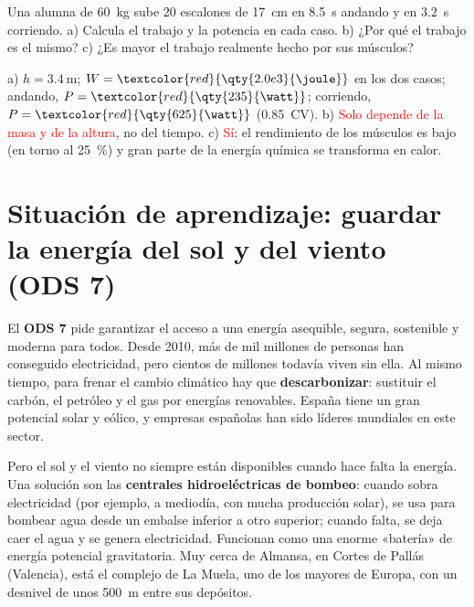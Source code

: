 \begin{exercise}
    Una alumna de \qty{60}{\kg} sube 20 escalones de \qty{17}{\cm} en \qty{8.5}{\s} andando y en \qty{3.2}{\s} corriendo. a) Calcula el
    trabajo y la potencia en cada caso. b) ¿Por qué el trabajo es el mismo? c) ¿Es mayor el trabajo realmente hecho por sus músculos?
    \begin{solu}
        a) \(h = \qty{3.4}{\m}\); \(W = \textcolor{red}{\qty{2.0e3}{\joule}}\) en los dos casos; andando, \(P = \textcolor{red}{\qty{235}{\watt}}\);
        corriendo, \(P = \textcolor{red}{\qty{625}{\watt}}\) (\num{0.85}~CV). b) \textcolor{red}{Solo depende de la masa y de la
        altura}, no del tiempo. c) \textcolor{red}{Sí}: el rendimiento de los músculos es bajo (en torno al \qty{25}{\percent}) y gran
        parte de la energía química se transforma en calor.
    \end{solu}
\end{exercise}

\section{Situación de aprendizaje: guardar la energía del sol y del viento (ODS 7)}\label{sec:ud12-ods}

El \textbf{ODS 7} pide garantizar el acceso a una energía asequible, segura, sostenible y moderna para todos. Desde 2010, más de mil
millones de personas han conseguido electricidad, pero cientos de millones todavía viven sin ella. Al mismo tiempo, para frenar el
cambio climático hay que \textbf{descarbonizar}: sustituir el carbón, el petróleo y el gas por energías renovables. España tiene un
gran potencial solar y eólico, y empresas españolas han sido líderes mundiales en este sector.

Pero el sol y el viento no siempre están disponibles cuando hace falta la energía. Una solución son las \textbf{centrales hidroeléctricas
de bombeo}: cuando sobra electricidad (por ejemplo, a mediodía, con mucha producción solar), se usa para bombear agua desde un embalse
inferior a otro superior; cuando falta, se deja caer el agua y se genera electricidad. Funcionan como una enorme «batería» de energía
potencial gravitatoria. Muy cerca de Almansa, en Cortes de Pallás (Valencia), está el complejo de La Muela, uno de los mayores de Europa,
con un desnivel de unos \qty{500}{\m} entre sus depósitos.

